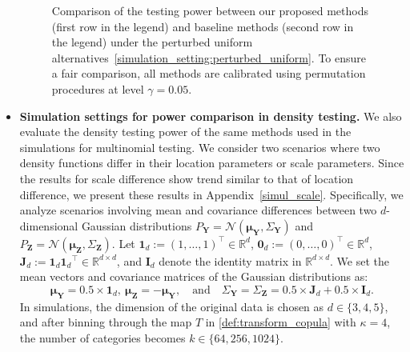 \documentclass[twoside,11pt]{article}
\newcommand{\vecOne}[1]{\mathbf{1}_{#1}}
\newcommand{\vecZero}[1]{\mathbf{0}_{#1}}
\newcommand{\matOne}[1]{\mathbf{J}_{#1}}
\newcommand{\numbersetReal}{\mathbb{R}} %
\newcommand{\rvTwo}{Y}
\newcommand{\rvThree}{Z}
\newcommand{\vectorize}[1]{\mathbf{#1}}
\newcommand{\dimDensity}{d} %
\begin{document}
\begin{itemize}
\begin{figure}[t!]
	\caption{
		Comparison of the testing power between our proposed methods (first row in the legend) and baseline methods (second row in the legend) under the perturbed uniform alternatives~\eqref{simulation_setting:perturbed_uniform}. To ensure a fair comparison, all methods are calibrated using permutation procedures at level $\gamma = 0.05$.
	}
	\label{fig:power_multinomial}
\end{figure}

\item \textbf{Simulation settings for power comparison in density testing.}
We also evaluate the density testing power of the same methods used in the simulations for multinomial testing. We consider two scenarios where two density functions differ in their location parameters or scale parameters. Since the results for scale difference show trend similar to that of location difference, we present these results in Appendix~\ref{simul_scale}.
Specifically, we analyze scenarios involving mean and covariance differences between two $\dimDensity$-dimensional Gaussian distributions
$P_{\vectorize{\rvTwo}} = \mathcal{N}(
\boldsymbol{\mu}_{\vectorize{\rvTwo}}
,
\Sigma_{\vectorize{\rvTwo}}
)$
and
$P_{\vectorize{\rvThree}} = \mathcal{N}(
\boldsymbol{\mu}_{\vectorize{\rvThree}}
,
\Sigma_{\vectorize{\rvThree}}
)$. 
Let 
$
\vecOne{\dimDensity}:= (1, \ldots , 1)^\top 
\in \numbersetReal^\dimDensity
$,
$
\vecZero{\dimDensity} := (0, \ldots , 0)^\top 
\in \numbersetReal^\dimDensity$, 
%
$\matOne{\dimDensity}
:=
\vecOne{\dimDensity} {\mathbf{1}_d}^\top
\in
\numbersetReal^{\dimDensity \times \dimDensity}
$, and $\mathbf{I}_d$  denote the identity matrix in
$\mathbb{R}^{d\times d}$.
We set the mean vectors and covariance matrices of the Gaussian distributions as:
\begin{equation}\label{alternative:density_location}
	\boldsymbol{\mu}_{\vectorize{\rvTwo}}=
	0.5 \times \mathbf{1}_{\dimDensity},~
	\boldsymbol{\mu}_{\vectorize{\rvThree}}=
	-\boldsymbol{\mu}_{\vectorize{\rvTwo}},
	\quad \text{and} \quad
	\Sigma_{\vectorize{\rvTwo}}
	=
	\Sigma_{\vectorize{\rvThree}}
	=
	0.5 \times\mathbf{J}_{\dimDensity}
	+
	0.5 \times \mathbf{I}_{\dimDensity}.
\end{equation}
In simulations, the dimension of the original data is chosen as $\dimDensity \in \{3,4,5\}$, and after binning through the map $T$ in \eqref{def:transform_copula} with $\kappa = 4$, the number of categories becomes $k \in \{64,256,1024\}$. 



\end{itemize}
\end{document}
